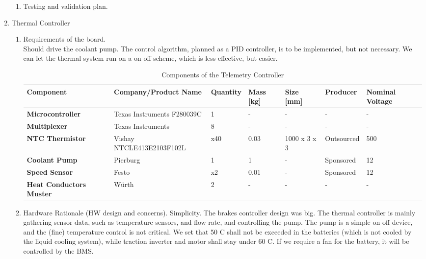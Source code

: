 \begin{enumerate}
\begin{enumerate}
        \item Testing and validation plan.


    \end{enumerate}

    \item Thermal Controller
        \begin{enumerate}
            \item Requirements of the board.\\
            Should drive the coolant pump. The control algorithm, planned as a PID controller, is to be implemented, but not necessary. We can let the thermal system run on a on-off scheme, which is less effective, but easier.

        \begin{table}[H]
            \centering
            \begin{adjustbox}{width=\textwidth,center}
            \begin{tabular}{|>{\bfseries}m{2cm}|m{4cm}|m{1.5cm}|m{1.5cm}|m{2cm}|m{2cm}|m{2cm}|}
                \hline
                Component & Company/Product Name & Quantity & Mass [kg] & Size [mm] & Producer & Nominal Voltage \\
                \hline
                Microcontroller & Texas Instruments F280039C & 1 & - & - & - & - \\
                \hline
                Multiplexer & Texas Instruments & 8 & - & - & - & - \\
                \hline
                NTC Thermistor & Vishay NTCLE413E2103F102L & x40 & 0.03 & 1000 x 3 x 3 & Outsourced & 500 \\
                \hline
                Coolant Pump & Pierburg & 1 & 1 & - & Sponsored & 12 \\
                Speed Sensor & Festo & x2 & 0.01 & - & Sponsored & 12 \\
                Heat Conductors Muster & Würth & 2 & - & - & - & - \\
                \hline
            \end{tabular}
            \end{adjustbox}
            \caption{Components of the Telemetry Controller}
            \label{tab:telemetry-ctrl-components}
        \end{table}
            \item Hardware Rationale (HW design and concerns).
            Simplicity. The brakes controller design was big. The thermal controller is mainly gathering sensor data, such as temperature sensors, and flow rate, and controlling the pump. The pump is a simple on-off device, and the (fine) temperature control is not critical. We set that 50 C shall not be exceeded in the batteries (which is not cooled by the liquid cooling system), while traction inverter and motor shall stay under 60 C. If we require a fan for the battery, it will be controlled by the BMS.

\end{enumerate}
\end{enumerate}
